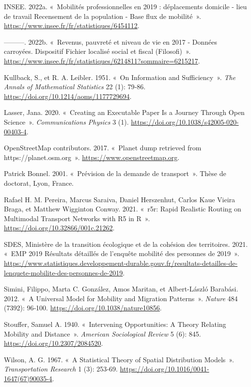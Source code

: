 \documentclass[
  10pt,
  a4paper,
  numbers=noendperiod,
  DIV=12]{scrartcl}
\newlength{\cslhangindent}
\newlength{\cslentryspacingunit} %
\newenvironment{CSLReferences}[2] %
 {%
  \setlength{\parindent}{0pt}
  \ifodd #1
  \let\oldpar\par
  \def\par{\hangindent=\cslhangindent\oldpar}
  \fi
  \setlength{\parskip}{#2\cslentryspacingunit}
 }%
 {}
\begin{document}
\begin{CSLReferences}{1}{0}
\leavevmode{}%
INSEE. 2022a. {«~Mobilités professionnelles en 2019 : déplacements
domicile - lieu de travail Recensement de la population - Base flux de
mobilité~»}. \url{https://www.insee.fr/fr/statistiques/6454112}.

\leavevmode{}%
---------. 2022b. {«~Revenus, pauvreté et niveau de vie en 2017 -
Données carroyées. Dispositif Fichier localisé social et fiscal
(Filosofi)~»}.
\url{https://www.insee.fr/fr/statistiques/6214811?sommaire=6215217}.

\leavevmode{}%
Kullback, S., et R. A. Leibler. 1951. {«~On Information and
Sufficiency~»}. \emph{The Annals of Mathematical Statistics} 22 (1):
79‑86. \url{https://doi.org/10.1214/aoms/1177729694}.

\leavevmode{}%
Lasser, Jana. 2020. {«~Creating an Executable Paper Is a Journey Through
Open Science~»}. \emph{Communications Physics} 3 (1).
\url{https://doi.org/10.1038/s42005-020-00403-4}.

\leavevmode{}%
OpenStreetMap contributors. 2017. {«~{Planet dump retrieved from
https://planet.osm.org}~»}. \url{https://www.openstreetmap.org}.

\leavevmode{}%
Patrick Bonnel. 2001. {«~Prévision de la demande de transport~»}. Thèse
de doctorat, Lyon, France.

\leavevmode{}%
Rafael H. M. Pereira, Marcus Saraiva, Daniel Herszenhut, Carlos Kaue
Vieira Braga, et Matthew Wigginton Conway. 2021. {«~r5r: Rapid Realistic
Routing on Multimodal Transport Networks with R5 in R~»}.
\url{https://doi.org/10.32866/001c.21262}.

\leavevmode{}%
SDES, Ministère de la transition écologique et de la cohésion des
territoires. 2021. {«~EMP 2019 Résultats détaillés de l'enquête mobilité
des personnes de 2019~»}.
\url{https://www.statistiques.developpement-durable.gouv.fr/resultats-detailles-de-lenquete-mobilite-des-personnes-de-2019}.

\leavevmode{}%
Simini, Filippo, Marta C. González, Amos Maritan, et Albert-László
Barabási. 2012. {«~A Universal Model for Mobility and Migration
Patterns~»}. \emph{Nature} 484 (7392): 96‑100.
\url{https://doi.org/10.1038/nature10856}.

\leavevmode{}%
Stouffer, Samuel A. 1940. {«~Intervening Opportunities: A Theory
Relating Mobility and Distance~»}. \emph{American Sociological Review} 5
(6): 845. \url{https://doi.org/10.2307/2084520}.

\leavevmode{}%
Wilson, A. G. 1967. {«~A Statistical Theory of Spatial Distribution
Models~»}. \emph{Transportation Research} 1 (3): 253‑69.
\url{https://doi.org/10.1016/0041-1647(67)90035-4}.

\end{CSLReferences}

\newpage{}

\listoffigures

\listoftables
\end{document}
